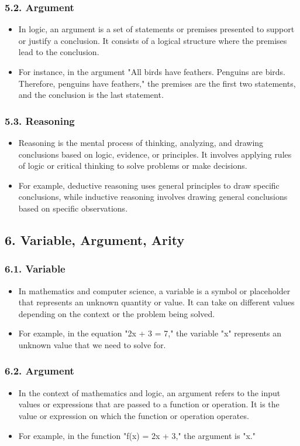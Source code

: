 \documentclass{article}
\begin{document}
\subsubsection*{5.2. Argument}
\begin{itemize}
\item In logic, an argument is a set of statements or premises presented to support or justify a conclusion. It consists of a logical structure where the premises lead to the conclusion.
\item For instance, in the argument "All birds have feathers. Penguins are birds. Therefore, penguins have feathers," the premises are the first two statements, and the conclusion is the last statement.
\end{itemize}
\subsubsection*{5.3. Reasoning}
\begin{itemize}
\item Reasoning is the mental process of thinking, analyzing, and drawing conclusions based on logic, evidence, or principles. It involves applying rules of logic or critical thinking to solve problems or make decisions.
\item For example, deductive reasoning uses general principles to draw specific conclusions, while inductive reasoning involves drawing general conclusions based on specific observations.
\end{itemize}
\clearpage
\subsection*{6. Variable, Argument, Arity}
\subsubsection*{6.1. Variable}
\begin{itemize}
\item In mathematics and computer science, a variable is a symbol or placeholder that represents an unknown quantity or value. It can take on different values depending on the context or the problem being solved.
\item For example, in the equation "2x + 3 = 7," the variable "x" represents an unknown value that we need to solve for.
\end{itemize}
\subsubsection*{6.2. Argument}
\begin{itemize}
\item In the context of mathematics and logic, an argument refers to the input values or expressions that are passed to a function or operation. It is the value or expression on which the function or operation operates.
\item For example, in the function "f(x) = 2x + 3," the argument is "x."
\end{itemize}
\end{document}
